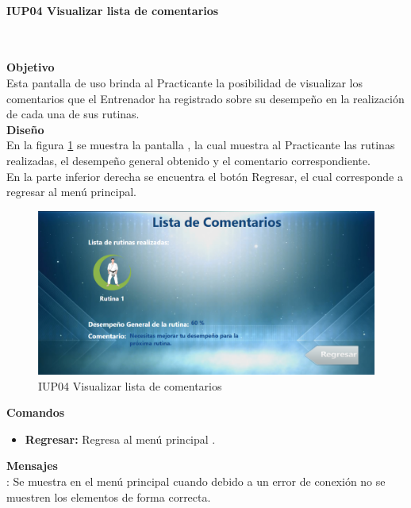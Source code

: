 \paragraph{IUP04 Visualizar lista de comentarios} \hspace{1cm}\\ 
\label{pant:IUP04} 

\textbf{\textcolor[rgb]{0, 0, 0.545098}{Objetivo}}\\
Esta pantalla de uso brinda al Practicante la posibilidad de visualizar los comentarios que el Entrenador ha registrado sobre su desempeño en la realización de cada una de sus rutinas.\\

\textbf{\textcolor[rgb]{0, 0, 0.545098}{Diseño}}\\
En la figura \ref{fig:IUP04} se muestra la pantalla , la cual muestra al Practicante las rutinas realizadas, el desempeño general obtenido y el comentario correspondiente.\\

En la parte inferior derecha se encuentra el botón Regresar, el cual corresponde a regresar al menú principal.

\begin{figure}[H]
	\centering
		\includegraphics[scale=0.5]{./Figuras/Pantallas/IUP04Visualizar_lista_de_comentarios}
	\caption{IUP04 Visualizar lista de comentarios}
	\label{fig:IUP04}
\end{figure}

\textbf{\textcolor[rgb]{0, 0, 0.545098}{Comandos}}
\begin{itemize}
	\item \textbf{\textcolor[rgb]{0, 0, 0.545098}{Regresar:}} Regresa al menú principal .
\end{itemize}
\vspace{1em}

\textbf{\textcolor[rgb]{0, 0, 0.545098}{Mensajes}}\\

\textbf{}: Se muestra en el menú principal  cuando debido a un error de conexión no se muestren los elementos de forma correcta.\\

\clearpage